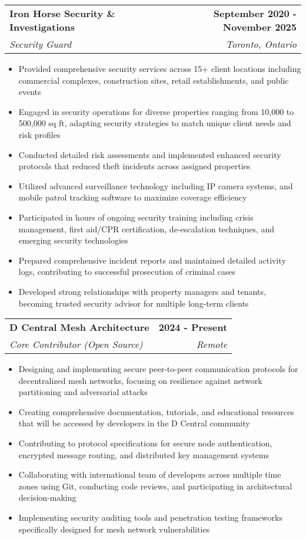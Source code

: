 \documentclass[letterpaper,11pt]{article}
\makeatletter
\newcommand{\resumeItem}[1]{
  \item\small{
    {#1 \vspace{-2pt}}
  }
}
\newcommand{\resumeSubheading}[4]{
  \vspace{-2pt}\item
    \begin{tabular*}{1.0\textwidth}[t]{l@{\extracolsep{\fill}}r}
      \textbf{#1} & \textbf{\small #2} \\
      \textit{\small#3} & \textit{\small #4} \\
    \end{tabular*}\vspace{-7pt}
}
\newcommand{\resumeItemListStart}{\begin{itemize}}
\newcommand{\resumeItemListEnd}{\end{itemize}\vspace{-5pt}}
\makeatother
\begin{document}
    \resumeSubheading
      {Iron Horse Security \& Investigations}{September 2020 - November 2025}
      {Security Guard}{Toronto, Ontario}
      \resumeItemListStart
        \resumeItem{Provided comprehensive security services across 15+ client locations including commercial complexes, construction sites, retail establishments, and public events}
        \resumeItem{Engaged in security operations for diverse properties ranging from 10,000 to 500,000 sq ft, adapting security strategies to match unique client needs and risk profiles}
        \resumeItem{Conducted detailed risk assessments and implemented enhanced security protocols that reduced theft incidents across assigned properties}
        \resumeItem{Utilized advanced surveillance technology including IP camera systems, and mobile patrol tracking software to maximize coverage efficiency}
        \resumeItem{Participated in hours of ongoing security training including crisis management, first aid/CPR certification, de-escalation techniques, and emerging security technologies}
        \resumeItem{Prepared comprehensive incident reports and maintained detailed activity logs, contributing to successful prosecution of criminal cases}
        \resumeItem{Developed strong relationships with property managers and tenants, becoming trusted security advisor for multiple long-term clients}
    \resumeItemListEnd

    \resumeSubheading
      {D Central Mesh Architecture}{2024 - Present}
      {Core Contributor (Open Source)}{Remote}
      \resumeItemListStart
        \resumeItem{Designing and implementing secure peer-to-peer communication protocols for decentralized mesh networks, focusing on resilience against network partitioning and adversarial attacks}
        \resumeItem{Creating comprehensive documentation, tutorials, and educational resources that will be accessed by developers in the D Central community}
        \resumeItem{Contributing to protocol specifications for secure node authentication, encrypted message routing, and distributed key management systems}
        \resumeItem{Collaborating with international team of developers across multiple time zones using Git, conducting code reviews, and participating in architectural decision-making}
        \resumeItem{Implementing security auditing tools and penetration testing frameworks specifically designed for mesh network vulnerabilities}
    \resumeItemListEnd
\end{document}
